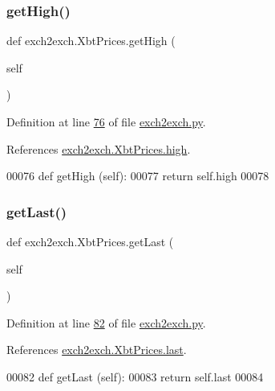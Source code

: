 \subsubsection{\texorpdfstring{get\+High()}{getHigh()}}
{\footnotesize\ttfamily def exch2exch.\+Xbt\+Prices.\+get\+High (\begin{DoxyParamCaption}\item[{}]{self }\end{DoxyParamCaption})}



Definition at line \hyperlink{exch2exch_8py_source_l00076}{76} of file \hyperlink{exch2exch_8py_source}{exch2exch.\+py}.



References \hyperlink{exch2exch_8py_source_l00061}{exch2exch.\+Xbt\+Prices.\+high}.


\begin{DoxyCode}
00076     \textcolor{keyword}{def }getHigh (self):
00077         \textcolor{keywordflow}{return} self.high
00078         
\end{DoxyCode}
\mbox{\label{classexch2exch_1_1_xbt_prices_a2b28c55545cb3bc56cd64e05f0e5b30b}} 
\subsubsection{\texorpdfstring{get\+Last()}{getLast()}}
{\footnotesize\ttfamily def exch2exch.\+Xbt\+Prices.\+get\+Last (\begin{DoxyParamCaption}\item[{}]{self }\end{DoxyParamCaption})}



Definition at line \hyperlink{exch2exch_8py_source_l00082}{82} of file \hyperlink{exch2exch_8py_source}{exch2exch.\+py}.



References \hyperlink{exch2exch_8py_source_l00063}{exch2exch.\+Xbt\+Prices.\+last}.


\begin{DoxyCode}
00082     \textcolor{keyword}{def }getLast (self):
00083         \textcolor{keywordflow}{return} self.last
00084         
\end{DoxyCode}
\mbox{\label{classexch2exch_1_1_xbt_prices_ae9b94f4f95f7ba5369416fde77308e7e}} 
